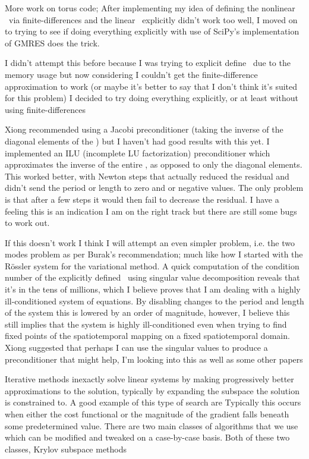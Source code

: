More work on torus code; After implementing my idea of defining
the nonlinear \jacobianM\ via finite-differences and the linear \jacobianM\
explicitly didn't work too well, I moved on to trying to see if doing everything
explicitly with use of SciPy's implementation of GMRES does the trick.

I didn't attempt this before because I was trying to explicit define \jacobianMs\
due to the memory usage but now considering I couldn't get the finite-difference
approximation to work (or maybe it's better to say that I don't think it's suited
for this problem) I decided to try doing everything explicitly, or at least
without using finite-differences

Xiong recommended using a Jacobi preconditioner (taking the inverse of the diagonal
elements of the \jacobianM) but I haven't had good results with this yet. I implemented
an ILU (incomplete LU factorization) preconditioner which approximates the inverse
of the entire \jacobianM, as opposed to only the diagonal elements. This worked better,
with Newton steps that actually reduced the residual and didn't send the period or length
to zero and or negative values. The only problem is that after a few
steps it would then fail to decrease the residual.
 I have a feeling this is an indication I am on the right
track but there are still some bugs to work out.

If this doesn't work I think I will attempt an even simpler problem, i.e.
the two modes problem as per Burak's recommendation; much like how I started
with the R\"ossler system for the variational method.
A quick computation of the condition number of the explicitly defined \jacobianM\ using
singular value decomposition reveals that it's in the tens of millions, which I believe
proves that I am dealing with a highly ill-conditioned system of equations.
By disabling changes to the period and length of the system this is lowered by an
order of magnitude, however, I believe this still implies that the system is highly ill-conditioned
even when trying to find fixed points of the spatiotemporal mapping on a fixed spatiotemporal domain.
Xiong suggested that perhaps I can use the singular values to produce a preconditioner that might help,
I'm looking into this as well as some other papers\rf{Meza95}


Iterative
methods inexactly solve linear systems by making progressively
better approximations to the solution, typically by expanding
the subspace the solution is constrained to. A good example
of this type of search are
Typically this occurs when either the cost
functional or the magnitude of the gradient falls beneath some
predetermined value. There are two main classes of algorithms that we use
which can be modified and tweaked on a case-by-case basis. Both of these
two classes, Krylov subspace methods

